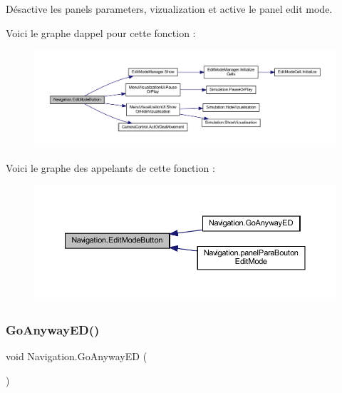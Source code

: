 Désactive les panels parameters, vizualization et active le panel edit mode. 

Voici le graphe d\textquotesingle{}appel pour cette fonction \+:
\nopagebreak
\begin{figure}[H]
\begin{center}
\leavevmode
\includegraphics[width=350pt]{class_navigation_af687f3df18da0e95175b04fe5cc7da56_cgraph}
\end{center}
\end{figure}
Voici le graphe des appelants de cette fonction \+:\nopagebreak
\begin{figure}[H]
\begin{center}
\leavevmode
\includegraphics[width=350pt]{class_navigation_af687f3df18da0e95175b04fe5cc7da56_icgraph}
\end{center}
\end{figure}
\mbox{\label{class_navigation_a17942535e76d66a1d290f9e7a2bc03ec}} 
\subsubsection{\texorpdfstring{Go\+Anyway\+E\+D()}{GoAnywayED()}}
{\footnotesize\ttfamily void Navigation.\+Go\+Anyway\+ED (\begin{DoxyParamCaption}{ }\end{DoxyParamCaption})\hspace{0.3cm}{\ttfamily [inline]}}



